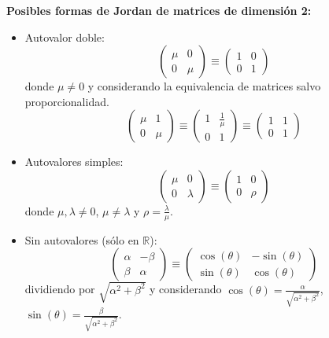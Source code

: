 \textbf{Posibles formas de Jordan de matrices de dimensión 2:}
\begin{itemize}
    \item Autovalor doble:
    \[
        \begin{pmatrix}
            \mu & 0 \\
            0 & \mu
        \end{pmatrix} \equiv \begin{pmatrix}
            1 & 0 \\
            0 & 1
        \end{pmatrix}
    \]
    donde $\mu \neq 0$ y considerando la equivalencia de matrices salvo proporcionalidad.
    \[
        \begin{pmatrix}
            \mu & 1 \\
            0 & \mu
        \end{pmatrix} \equiv \begin{pmatrix}
            1 & \frac{1}{\mu} \\
            0 & 1
        \end{pmatrix} \equiv \begin{pmatrix}
            1 & 1 \\
            0 & 1
        \end{pmatrix}
    \]
    \item Autovalores simples:
    \[
        \begin{pmatrix}
            \mu & 0 \\
            0 & \lambda
        \end{pmatrix} \equiv \begin{pmatrix}
            1 & 0 \\
            0 & \rho
        \end{pmatrix}
    \]
    donde $\mu, \lambda \neq 0$, $\mu \neq \lambda$ y $\rho = \frac{\lambda}{\mu}$.
    \item Sin autovalores (sólo en $\mathbb{R}$):
    \[
        \begin{pmatrix}
            \alpha & -\beta \\
            \beta & \alpha
        \end{pmatrix} \equiv \begin{pmatrix}
            \cos(\theta) & -\sin(\theta) \\
            \sin(\theta) & \cos(\theta)
        \end{pmatrix}
    \] 
    dividiendo por $\sqrt{\alpha^2 + \beta^2}$ y considerando $\cos(\theta) = \frac{\alpha}{\sqrt{\alpha^2 + \beta^2}}$, $\sin(\theta) = \frac{\beta}{\sqrt{\alpha^2 + \beta^2}}$.
\end{itemize}

